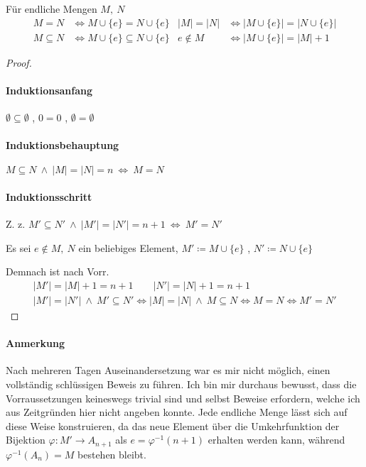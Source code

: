 \documentclass[a4paper, 12pt]{scrartcl}
\begin{document}
\begin{precondition}
Für endliche Mengen $M,\ N$
\begin{align*}
	 M = N &\Leftrightarrow M \cup \{e\} = N \cup \{e\} & |M| = |N| &\Leftrightarrow |M \cup \{e\}| = |N \cup \{e\}| \\
	 M \subseteq N &\Leftrightarrow M \cup \{e\} \subseteq N \cup \{e\} & e \notin M &\Leftrightarrow |M\cup \{e\}| = |M| + 1
\end{align*}
\end{precondition}
\begin{proof}\ \vspace{-1em}
\paragraph*{Induktionsanfang} $\emptyset \subseteq \emptyset$ , $0 = 0$ , $\emptyset = \emptyset$
\paragraph*{Induktionsbehauptung} $M \subseteq N \:\wedge\: |M| = |N| = n \ \Leftrightarrow\ M = N$
\paragraph*{Induktionsschritt} Z. z. $M' \subseteq N' \:\wedge\: |M'| = |N'| = n+1 \ \Leftrightarrow\ M' = N'$

Es sei $e \notin M,\ N$ ein beliebiges Element, $M' \coloneqq M \cup \{e\}$ , $N' \coloneqq N \cup \{e\}$

Demnach ist nach Vorr.
\begin{gather*}
	|M'| = |M|+1 = n+1 \qquad |N'| = |N| + 1 = n+1 \\
	|M'| = |N'| \:\wedge\: M' \subseteq N' \Leftrightarrow |M| = |N| \:\wedge\: M \subseteq N \Leftrightarrow M = N \Leftrightarrow M' = N'
\end{gather*}
\end{proof}
\paragraph*{Anmerkung} Nach mehreren Tagen Auseinandersetzung war es mir nicht möglich, einen vollständig schlüssigen Beweis zu führen. Ich bin mir durchaus bewusst, dass die Vorraussetzungen keineswegs trivial sind und selbst Beweise erfordern, welche ich aus Zeitgründen hier nicht angeben konnte. Jede endliche Menge lässt sich auf diese Weise konstruieren, da das neue Element über die Umkehrfunktion der Bijektion $\varphi: M' \rightarrow A_{n+1}$ als $e = \varphi^{-1}(n+1)$ erhalten werden kann, während $\varphi^{-1}(A_n) = M$ bestehen bleibt.
\end{document}
